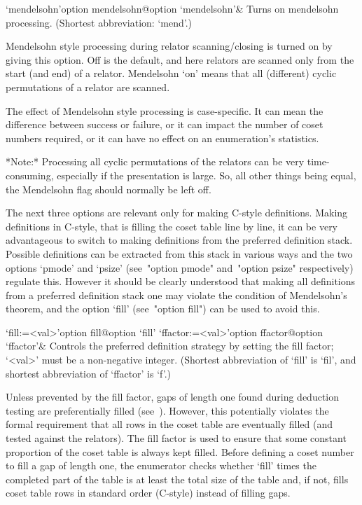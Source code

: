\>`mendelsohn'{option mendelsohn}@{option `mendelsohn'}&
Turns on mendelsohn processing. (Shortest abbreviation: `mend'.)

Mendelsohn style processing during relator scanning/closing is  turned
on by giving this option. Off is the default, and  here  relators  are
scanned only from  the  start  (and  end)  of  a  relator.  Mendelsohn
\lq{}on' means that all (different) cyclic permutations of  a  relator
are scanned.

The effect of Mendelsohn style processing  is  case-specific.  It  can
mean the difference between success or failure, or it can  impact  the
number of coset numbers required, or it  can  have  no  effect  on  an
enumeration's statistics.

*Note:* Processing all cyclic permutations of the relators can be very
time-consuming,  especially if  the  presentation is  large.  So,  all
other things being equal, the  Mendelsohn flag should normally be left
off.

\enditems


The  next  three  options  are  relevant  only  for   making   C-style
definitions. Making definitions in C-style, that is filling the  coset
table line by line, it can be very advantageous to  switch  to  making
definitions from the preferred definition stack. Possible  definitions
can be extracted from this stack in various ways and the  two  options
`pmode'   and   `psize'   (see~"option   pmode"   and~"option   psize"
respectively) regulate this. However it should be  clearly  understood
that making all definitions from a preferred definition stack one  may
violate the condition of Mendelsohn's theorem, and the  option  `fill'
(see~"option fill") can be used to avoid this.

\beginitems

\>`fill:=<val>'{option fill}@{option `fill'}
\>`ffactor:=<val>'{option ffactor}@{option `ffactor'}&
Controls the preferred definition strategy by setting the fill factor;
`<val>' must be a non-negative integer.
(Shortest abbreviation of `fill' is `fil', and  shortest  abbreviation
of `ffactor' is `f'.)

Unless prevented by the fill factor, gaps of length one  found  during
deduction  testing  are  preferentially   filled   (see~\cite{Hav91}).
However, this potentially violates the  formal  requirement  that  all
rows in the coset table are eventually filled (and tested against  the
relators). The fill factor  is  used  to  ensure  that  some  constant
proportion of the coset table is always kept filled. Before defining a
coset number to fill a  gap  of  length  one,  the  enumerator  checks
whether `fill' times the completed part of the table is at  least  the
total size of the table  and,  if  not,  fills  coset  table  rows  in
standard order (C-style) instead of filling gaps.

